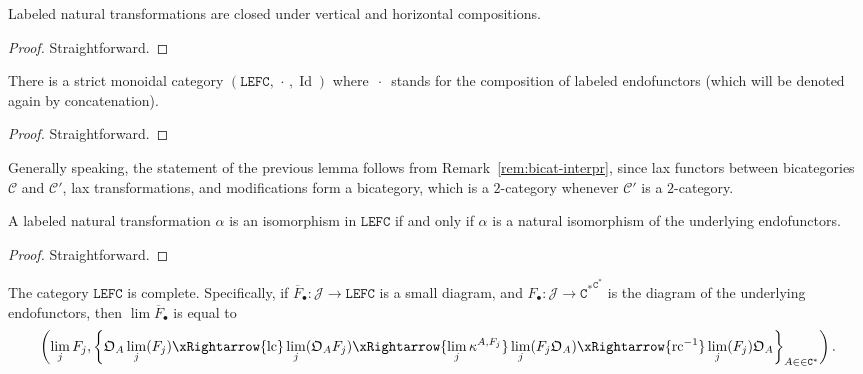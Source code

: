 \documentclass[10pt]{simplearticle}
\newcommand{\Id}{\operatorname{Id}}
\newcommand{\LEFC}{\mathbb{\mathtt{LEFC}}}
\newcommand{\Cstar}{\mathtt{C^{*}}}
\newcommand{\EFC}{\Cstar^{\Cstar}}
\newcommand{\rc}{\operatorname{rc}}
\newcommand{\lc}{\operatorname{lc}}
\newcommand{\singledot}{\,\cdot\,}
\begin{document}
\begin{lem}\label{lem:adm-vh-closed}
Labeled
natural transformations
are closed under vertical and horizontal compositions.
\end{lem}

\begin{proof}
Straightforward.
\end{proof}

\begin{lem}
There is a strict monoidal category $(\LEFC,\singledot,\Id)$ where
$\singledot$ stands for the composition of labeled endofunctors (which
will be denoted again by concatenation).
\end{lem}

\begin{proof}
Straightforward.
\end{proof}

\begin{rem}
Generally speaking, the statement of the previous lemma follows from
Remark~\ref{rem:bicat-interpr}, since lax functors between bicategories
$\mathcal{C}$ and $\mathcal{C}'$, lax transformations, and modifications
form a bicategory, which is a $2$-category whenever $\mathcal{C}'$
is a $2$-category.
\end{rem}

\begin{lem}\label{lem:labeled-isom}
A labeled natural transformation $\alpha$
is an isomorphism in $\LEFC$ if and only if $\alpha$ is a natural
isomorphism of the underlying endofunctors.
\end{lem}

\begin{proof}
Straightforward.
\end{proof}

\begin{prop}\label{prop:lefc-complete}
The category $\LEFC$ is complete. Specifically,
if $\overline{F}_{\bullet}\colon\mathcal{J}\to\LEFC$ is a small diagram,
and $F_{\bullet}\colon\mathcal{J}\to\EFC$ is the diagram of the underlying
endofunctors, then $\lim\overline{F}_{\bullet}$ is equal to
\[
\left(\lim_{j}F_{j},\left\{ \mathfrak{O}_{A}\lim_{j}(F_{j})\xRightarrow{\lc}\lim_{j}(\mathfrak{O}_{A}F_{j})\xRightarrow{\lim_{j}\kappa^{A,F_{j}}}\lim_{j}(F_{j}\mathfrak{O}_{A})\xRightarrow{\rc^{-1}}\lim_{j}(F_{j})\mathfrak{O}_{A}\right\} _{A\in\in\Cstar}\right).
\]
\end{prop}
\end{document}
